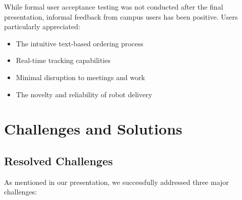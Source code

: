 \documentclass[12pt]{article}
\begin{document}
While formal user acceptance testing was not conducted after the final presentation, informal feedback from campus users has been positive. Users particularly appreciated:

\begin{itemize}
    \item The intuitive text-based ordering process
    \item Real-time tracking capabilities
    \item Minimal disruption to meetings and work
    \item The novelty and reliability of robot delivery
\end{itemize}

\section{Challenges and Solutions}

\subsection{Resolved Challenges}

As mentioned in our presentation, we successfully addressed three major challenges:
\end{document}
